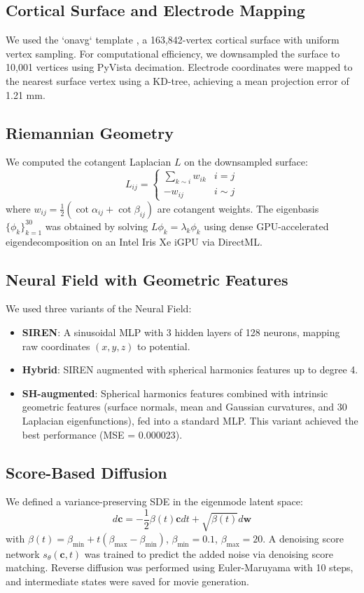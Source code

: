 \documentclass[twocolumn]{article}
\begin{document}
	\subsection{Cortical Surface and Electrode Mapping}
	We used the `onavg` template \cite{feilong2024}, a 163,842-vertex cortical surface with uniform vertex sampling. For computational efficiency, we downsampled the surface to 10,001 vertices using PyVista \cite{sullivan2019} decimation. Electrode coordinates were mapped to the nearest surface vertex using a KD-tree, achieving a mean projection error of 1.21 mm.
	
	\subsection{Riemannian Geometry}
	We computed the cotangent Laplacian \( L \) on the downsampled surface:
	\[
	L_{ij} = \begin{cases}
		\sum_{k \sim i} w_{ik} & i = j \\
		-w_{ij} & i \sim j
	\end{cases}
	\]
	where \( w_{ij} = \frac{1}{2}(\cot \alpha_{ij} + \cot \beta_{ij}) \) are cotangent weights. The eigenbasis \( \{\phi_k\}_{k=1}^{30} \) was obtained by solving \( L \phi_k = \lambda_k \phi_k \) using dense GPU-accelerated eigendecomposition on an Intel Iris Xe iGPU via DirectML.
	
	\subsection{Neural Field with Geometric Features}
	We used three variants of the Neural Field:
	\begin{itemize}
		\item \textbf{SIREN}: A sinusoidal MLP \cite{sitzmann2020} with 3 hidden layers of 128 neurons, mapping raw coordinates \( (x, y, z) \) to potential.
		\item \textbf{Hybrid}: SIREN augmented with spherical harmonics features up to degree 4.
		\item \textbf{SH-augmented}: Spherical harmonics features combined with intrinsic geometric features (surface normals, mean and Gaussian curvatures, and 30 Laplacian eigenfunctions), fed into a standard MLP. This variant achieved the best performance (MSE = 0.000023).
	\end{itemize}
	
	\subsection{Score-Based Diffusion}
	We defined a variance-preserving SDE in the eigenmode latent space:
	\[
	d\mathbf{c} = -\frac{1}{2}\beta(t) \mathbf{c} dt + \sqrt{\beta(t)} d\mathbf{w}
	\]
	with \( \beta(t) = \beta_{\min} + t(\beta_{\max} - \beta_{\min}) \), \( \beta_{\min}=0.1 \), \( \beta_{\max}=20 \). A denoising score network \( s_\theta(\mathbf{c}, t) \) was trained to predict the added noise via denoising score matching. Reverse diffusion was performed using Euler-Maruyama with 10 steps, and intermediate states were saved for movie generation.
	
\end{document}
